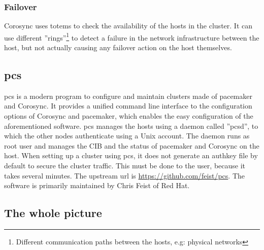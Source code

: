 \subsubsection{Failover}
Corosync uses totems\cite{Amir95thetotem} to check the availability of the hosts
in the cluster. It can use different ''rings''\footnote{Different communication
paths between the hosts, e.g: physical networks} to detect a failure
in the network infrastructure between the host, but not actually causing any failover
action on the host themselves.

\subsection{pcs}
\ac{pcs} is a modern program to configure and maintain clusters made of pacemaker and Corosync. It provides a unified command line interface to the configuration options of Corosync and pacemaker, which enables the easy configuration of the aforementioned software. pcs manages
the hosts using a daemon called ''pcsd'', to which the other nodes authenticate using a Unix account.
The daemon runs as root user and manages the \ac{CIB} and the status of pacemaker and Corosync on the host.
When setting up a cluster using pcs, it does not generate an authkey file by default to secure the
cluster traffic. This must be done to the user, because it takes several minutes.
The upstream url is \url{https://github.com/feist/pcs}. The software is primarily maintained by Chris Feist of Red Hat.

\subsection{The whole picture}
